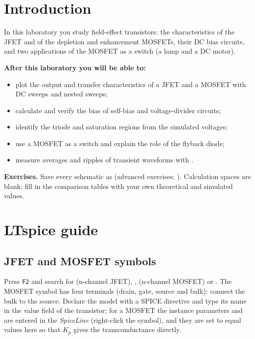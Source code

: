 
\section{Introduction}
In this laboratory you study field-effect transistors: the characteristics of the JFET and of the depletion and enhancement MOSFETs, their DC bias circuits, and two applications of the MOSFET as a switch (a lamp and a DC motor).

\textbf{After this laboratory you will be able to:}
\begin{itemize}
  \item plot the output and transfer characteristics of a JFET and a MOSFET with DC sweeps and nested sweeps;
  \item calculate and verify the bias of self-bias and voltage-divider circuits;
  \item identify the triode and saturation regions from the simulated voltages;
  \item use a MOSFET as a switch and explain the role of the flyback diode;
  \item measure averages and ripples of transient waveforms with .
\end{itemize}

\textbf{Exercises.} Save every schematic as  (advanced exercises: ). Calculation spaces are blank; fill in the comparison tables with your own theoretical and simulated values.

\section{LTspice guide}

\subsection{JFET and MOSFET symbols}
Press \texttt{F2} and search for  (n-channel JFET), ,  (n-channel MOSFET) or . The MOSFET symbol has four terminals (drain, gate, source and bulk): connect the bulk to the source. Declare the model with a SPICE directive and type its name in the value field of the transistor; for a MOSFET the instance parameters  and  are entered in the \textit{SpiceLine} (right-click the symbol), and they are set to equal values here so that $K_p$ gives the transconductance directly.

